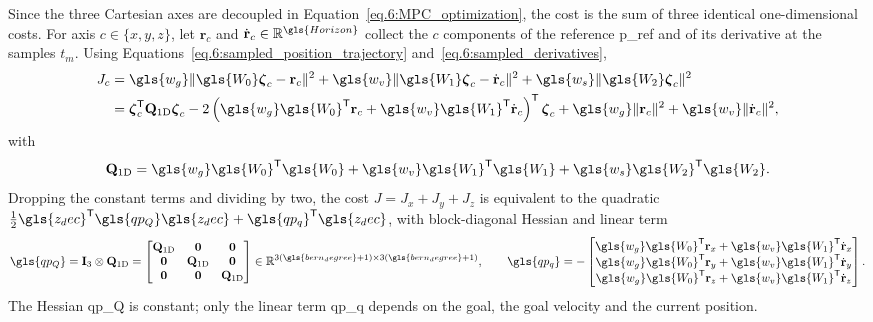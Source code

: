 Since the three Cartesian axes are decoupled in Equation~\eqref{eq.6:MPC_optimization}, the cost is the sum of three identical one-dimensional costs. For axis $c\in\{x,y,z\}$, let $\mathbf{r}_c$ and $\dot{\mathbf{r}}_c\in\mathbb{R}^{\gls{Horizon}}$ collect the $c$ components of the reference \gls{p_ref} and of its derivative at the samples $t_m$. Using Equations~\eqref{eq.6:sampled_position_trajectory} and~\eqref{eq.6:sampled_derivatives},
\begin{align}
    J_c
    &=
    \gls{w_g}\|\gls{W_0}\boldsymbol{\zeta}_c-\mathbf{r}_c\|^2
    +\gls{w_v}\|\gls{W_1}\boldsymbol{\zeta}_c-\dot{\mathbf{r}}_c\|^2
    +\gls{w_s}\|\gls{W_2}\boldsymbol{\zeta}_c\|^2
    \nonumber\\
    &=
    \boldsymbol{\zeta}_c^{\mathsf T}\mathbf{Q}_{\mathrm{1D}}\boldsymbol{\zeta}_c
    -2\left(\gls{w_g}\gls{W_0}^{\mathsf T}\mathbf{r}_c+\gls{w_v}\gls{W_1}^{\mathsf T}\dot{\mathbf{r}}_c\right)^{\mathsf T}\boldsymbol{\zeta}_c
    +\gls{w_g}\|\mathbf{r}_c\|^2+\gls{w_v}\|\dot{\mathbf{r}}_c\|^2,
\end{align}
with
\begin{equation}
    \mathbf{Q}_{\mathrm{1D}} = \gls{w_g} \gls{W_0}^{\mathsf T} \gls{W_0} + \gls{w_v} \gls{W_1}^{\mathsf T} \gls{W_1} + \gls{w_s} \gls{W_2}^{\mathsf T} \gls{W_2}.
\end{equation}
Dropping the constant terms and dividing by two, the cost $J=J_x+J_y+J_z$ is equivalent to the quadratic $\tfrac12\gls{z_dec}^{\mathsf T}\gls{qp_Q}\gls{z_dec}+\gls{qp_q}^{\mathsf T}\gls{z_dec}$, with block-diagonal Hessian and linear term
\begin{equation}
    \gls{qp_Q}=\mathbf{I}_3\otimes\mathbf{Q}_{\mathrm{1D}}=
    \begin{bmatrix}
    \mathbf{Q}_{\mathrm{1D}}&\mathbf{0}&\mathbf{0}\\
    \mathbf{0}&\mathbf{Q}_{\mathrm{1D}}&\mathbf{0}\\
    \mathbf{0}&\mathbf{0}&\mathbf{Q}_{\mathrm{1D}}
    \end{bmatrix}
    \in
    \mathbb{R}^{3(\gls{bern_degree}+1)\times3(\gls{bern_degree}+1)},
    \qquad
    \gls{qp_q}=-\begin{bmatrix}
    \gls{w_g}\gls{W_0}^{\mathsf T}\mathbf{r}_x+\gls{w_v}\gls{W_1}^{\mathsf T}\dot{\mathbf{r}}_x\\
    \gls{w_g}\gls{W_0}^{\mathsf T}\mathbf{r}_y+\gls{w_v}\gls{W_1}^{\mathsf T}\dot{\mathbf{r}}_y\\
    \gls{w_g}\gls{W_0}^{\mathsf T}\mathbf{r}_z+\gls{w_v}\gls{W_1}^{\mathsf T}\dot{\mathbf{r}}_z
    \end{bmatrix}.
    \label{eq:6:Q_matrix}
\end{equation}
The Hessian \gls{qp_Q} is constant; only the linear term \gls{qp_q} depends on the goal, the goal velocity and the current position.

